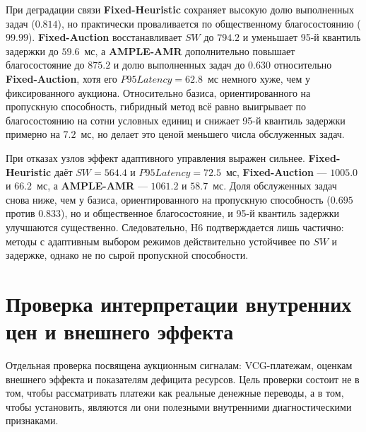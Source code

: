 


При деградации связи \textbf{Fixed-Heuristic} сохраняет высокую долю выполненных задач ($0.814$), но практически проваливается по общественному благосостоянию ($99.99$). \textbf{Fixed-Auction} восстанавливает $SW$ до $794.2$ и уменьшает 95-й квантиль задержки до $59.6$~мс, а \textbf{AMPLE-AMR} дополнительно повышает благосостояние до $875.2$ и долю выполненных задач до $0.630$ относительно \textbf{Fixed-Auction}, хотя его $P95Latency=62.8$~мс немного хуже, чем у фиксированного аукциона. Относительно базиса, ориентированного на пропускную способность, гибридный метод всё равно выигрывает по благосостоянию на сотни условных единиц и снижает 95-й квантиль задержки примерно на $7.2$~мс, но делает это ценой меньшего числа обслуженных задач.

При отказах узлов эффект адаптивного управления выражен сильнее. \textbf{Fixed-Heuristic} даёт $SW=564.4$ и $P95Latency=72.5$~мс, \textbf{Fixed-Auction} --- $1005.0$ и $66.2$~мс, а \textbf{AMPLE-AMR} --- $1061.2$ и $58.7$~мс. Доля обслуженных задач снова ниже, чем у базиса, ориентированного на пропускную способность ($0.695$ против $0.833$), но и общественное благосостояние, и 95-й квантиль задержки улучшаются существенно. Следовательно, H6 подтверждается лишь частично: методы с адаптивным выбором режимов действительно устойчивее по $SW$ и задержке, однако не по сырой пропускной способности.

\section{Проверка интерпретации внутренних цен и внешнего эффекта}

Отдельная проверка посвящена аукционным сигналам: VCG-платежам, оценкам внешнего эффекта и показателям дефицита ресурсов. Цель проверки состоит не в том, чтобы рассматривать платежи как реальные денежные переводы, а в том, чтобы установить, являются ли они полезными внутренними диагностическими признаками.


